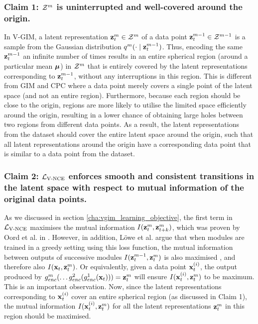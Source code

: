 		\subsubsection{Claim 1: $\mathcal{Z}^m$ is uninterrupted and well-covered around the origin.}
			In V-GIM, a latent representation $\mathbf{z}_t^m \in \mathcal{Z}^m$ of a data point $\mathbf{z}_t^{m-1} \in \mathcal{Z}^{m-1}$ is a sample from the Gaussian distribution $q^m(\cdot \mid \mathbf{z}_t^{m-1})$. Thus, encoding the same $\mathbf{z}_t^{m-1}$ an infinite number of times results in an entire spherical region (around a particular mean $\bm{\mu}$) in $\mathcal{Z}^m$ that is entirely covered by the latent representations corresponding to $\mathbf{z}_t^{m-1}$, without any interruptions in this region. This is different from GIM and CPC where a data point merely covers a single point of the latent space (and not an entire region). Furthermore, because each region should be close to the origin, regions are more likely to utilise the limited space efficiently around the origin, resulting in a lower chance of obtaining large holes between two regions from different data points. As a result, the latent representations from the dataset should cover the entire latent space around the origin, such that all latent representations around the origin have a corresponding data point that is similar to a data point from the dataset.
		
	
		\subsubsection{Claim 2: $\mathcal{L}_{\text{V-NCE}}$ enforces smooth and consistent transitions in the latent space with respect to mutual information of the original data points.}
			As we discussed in section \ref{cha:vgim_learning_objective}, the first term in $\mathcal{L}_{\text{V-NCE}}$ maximises the mutual information $I(\mathbf{z}_t^{m}, \mathbf{z}_{t+k}^m)$, which was proven by Oord et al. in \citep{oordRepresentationLearningContrastive2019}. However, in addition, Löwe et al. argue that when modules are trained in a greedy setting using this loss function, the mutual information between outputs of successive modules $I(\mathbf{z}_t^{m-1}, \mathbf{z}_t^{m})$ is also maximised \citep{lowePuttingEndEndtoEnd2020}, and therefore also $I(\mathbf{x}_t, \mathbf{z}_t^{m})$. Or equivalently, given a data point $\mathbf{x}_t^{(i)}$, the output produced by $ g_{enc}^m ( \dots	g_{enc}^2(g_{enc}^1(\mathbf{x}_t))) = \mathbf{z}_t^m$ will ensure $I(\mathbf{x}_t^{(i)}, \mathbf{z}_t^{m})$ to be maximum. This is an important observation. Now, since the latent representations corresponding to $\mathbf{x}_t^{(i)}$ cover an entire spherical region (as discussed in Claim 1), the mutual information $I(\mathbf{x}_t^{(i)}, \mathbf{z}_t^{m})$ for all the latent representations $\mathbf{z}_t^{m}$ in this region should be maximised.
			
